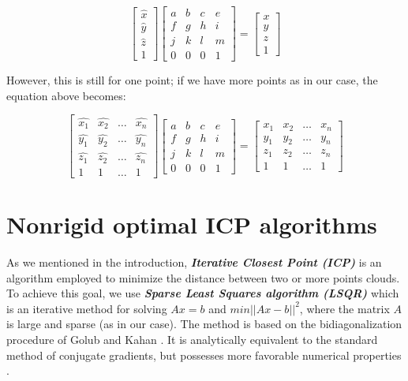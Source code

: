 \documentclass[../structure.tex]{subfiles}
\begin{document}
\begin{equation*}
\begin{bmatrix}
\hat{x} \\ \hat{y} \\ \hat{z} \\ 1
\end{bmatrix}
\begin{bmatrix}
a & b & c & e\\
f & g & h & i\\
j & k & l & m\\
0 & 0 & 0 & 1
\end{bmatrix}
=
\begin{bmatrix}
x \\ y \\ z \\ 1
\end{bmatrix}
\end{equation*}

However,  this is still for one point; if we have more points as in our case, the equation above becomes:

\begin{equation*}
\begin{bmatrix}
\hat{x_{1}} & \hat{x_{2}} & \dots & \hat{x_{n}}\\
\hat{y_{1}} & \hat{y_{2}} & \dots & \hat{y_{n}}\\
\hat{z_{1}} & \hat{z_{2}} & \dots & \hat{z_{n}}\\
1 & 1 & \dots & 1
\end{bmatrix}
\begin{bmatrix}
a & b & c & e\\
f & g & h & i\\
j & k & l & m\\
0 & 0 & 0 & 1
\end{bmatrix}
=
\begin{bmatrix}
x_{1} & x_{2} & \dots & x_{n}\\
y_{1} & y_{2} & \dots & y_{n}\\
z_{1} & z_{2} & \dots & z_{n}\\
1 & 1 & \dots & 1
\end{bmatrix}
\end{equation*}

\section{Nonrigid optimal ICP algorithms}
As we mentioned in the introduction, \textit{\textbf{ Iterative Closest Point (ICP)}} is an algorithm employed to minimize the distance between two or more points clouds. To achieve this goal, we use \textit{\textbf{Sparse Least Squares algorithm (LSQR)}} which is an iterative method for solving $Ax=b$ and $min||Ax-b||^2$, where the matrix $A$ is large and sparse (as in our case). The method is based on the bidiagonalization procedure of Golub and Kahan \cite{Paige1982a}. It is analytically equivalent to the standard method of conjugate gradients, but possesses more favorable numerical properties \cite{Paige1982a}.
\end{document}
